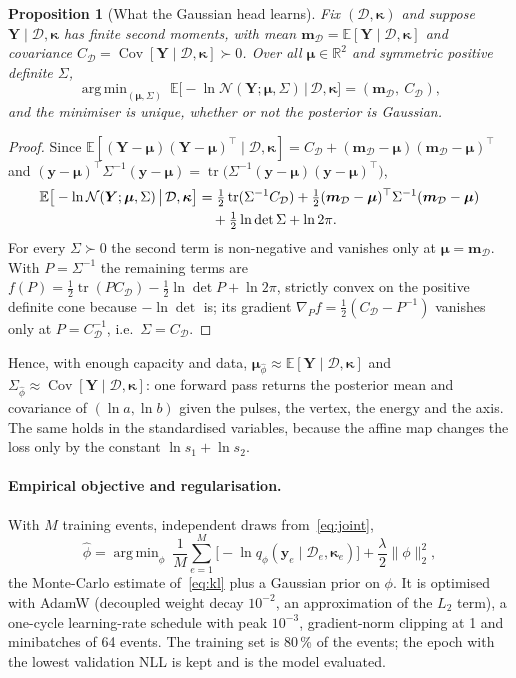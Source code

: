 \documentclass[11pt]{article}
\newtheorem{proposition}{Proposition}
\theoremstyle{definition}
\newcommand{\D}{\mathcal{D}}
\newcommand{\y}{\bm{y}}
\newcommand{\E}{\mathbb{E}}
\newcommand{\R}{\mathbb{R}}
\newcommand{\N}{\mathcal{N}}
\DeclareMathOperator*{\argmin}{arg\,min}
\DeclareMathOperator{\Cov}{Cov}
\DeclareMathOperator{\tr}{tr}
\begin{document}
\begin{proposition}[What the Gaussian head learns]
Fix $(\D,\bm\kappa)$ and suppose $\bm Y\mid\D,\bm\kappa$ has finite second moments, with mean
$\bm m_\D=\E[\bm Y\mid\D,\bm\kappa]$ and covariance $C_\D=\Cov[\bm Y\mid\D,\bm\kappa]\succ0$. Over all
$\bm\mu\in\R^2$ and symmetric positive definite $\Sigma$,
\begin{equation}
  \argmin_{(\bm\mu,\Sigma)}\ \E\big[-\ln\N(\bm Y;\bm\mu,\Sigma)\,\big|\,\D,\bm\kappa\big] = (\bm m_\D,\ C_\D),
\end{equation}
and the minimiser is unique, whether or not the posterior is Gaussian.
\end{proposition}
\begin{proof}
Since $\E[(\bm Y-\bm\mu)(\bm Y-\bm\mu)^\top\mid\D,\bm\kappa] = C_\D+(\bm m_\D-\bm\mu)(\bm m_\D-\bm\mu)^\top$ and
$(\y-\bm\mu)^\top\Sigma^{-1}(\y-\bm\mu)=\tr\big(\Sigma^{-1}(\y-\bm\mu)(\y-\bm\mu)^\top\big)$,
\begin{align}
  \E\big[-\ln\N(\bm Y;\bm\mu,\Sigma)\,\big|\,\D,\bm\kappa\big] &= \tfrac12\tr(\Sigma^{-1}C_\D)
  + \tfrac12(\bm m_\D-\bm\mu)^\top\Sigma^{-1}(\bm m_\D-\bm\mu) \notag\\
  &\quad + \tfrac12\ln\det\Sigma + \ln 2\pi .
\end{align}
For every $\Sigma\succ0$ the second term is non-negative and vanishes only at $\bm\mu=\bm m_\D$. With
$P=\Sigma^{-1}$ the remaining terms are $f(P)=\tfrac12\tr(PC_\D)-\tfrac12\ln\det P+\ln2\pi$, strictly convex on the
positive definite cone because $-\ln\det$ is; its gradient $\nabla_P f=\tfrac12(C_\D-P^{-1})$ vanishes only at
$P=C_\D^{-1}$, i.e.\ $\Sigma=C_\D$.
\end{proof}
Hence, with enough capacity and data, $\bm\mu_{\hat\phi}\approx\E[\bm Y\mid\D,\bm\kappa]$ and
$\Sigma_{\hat\phi}\approx\Cov[\bm Y\mid\D,\bm\kappa]$: one forward pass returns the posterior mean and covariance
of $(\ln a,\ln b)$ given the pulses, the vertex, the energy and the axis. The same holds in the standardised
variables, because the affine map changes the loss only by the constant $\ln s_1+\ln s_2$.

\paragraph{Empirical objective and regularisation.}
With $M$ training events, independent draws from~\eqref{eq:joint},
\begin{equation}
  \hat\phi = \argmin_\phi\ \frac1M\sum_{e=1}^{M}\big[-\ln q_\phi(\y_e\mid\D_e,\bm\kappa_e)\big] + \frac\lambda2\|\phi\|_2^2 ,
  \label{eq:emp}
\end{equation}
the Monte-Carlo estimate of~\eqref{eq:kl} plus a Gaussian prior on $\phi$. It is optimised with AdamW (decoupled
weight decay $10^{-2}$, an approximation of the $L_2$ term), a one-cycle learning-rate schedule with peak $10^{-3}$,
gradient-norm clipping at 1 and minibatches of 64 events. The training set is 80\,\% of the events; the epoch with
the lowest validation NLL is kept and is the model evaluated.
\end{document}
